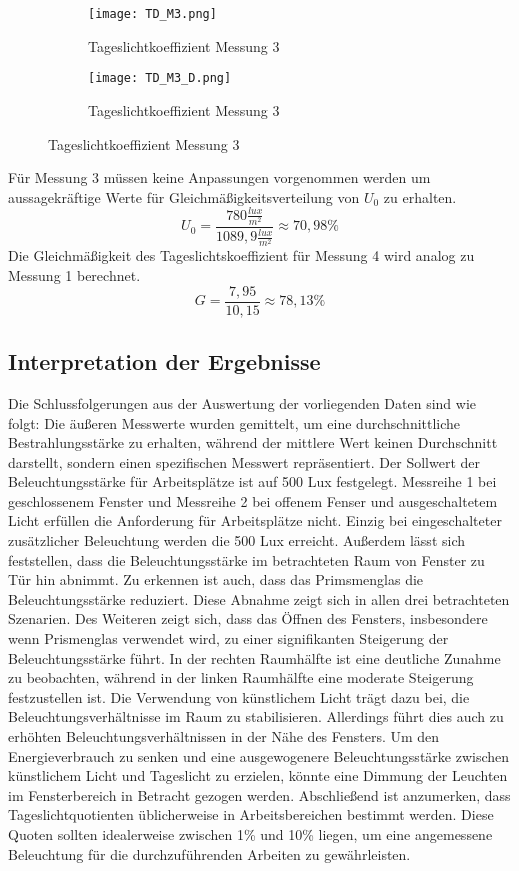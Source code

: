   \begin{figure}[H]
  \centering
  \begin{subfigure}[c]{0.5\textwidth}
      \texttt{[image: TD\_M3.png]}
      \caption{Tageslichtkoeffizient Messung 3}
      \label{fig:Tageslichtkoeffizient Messung 3}
  \end{subfigure}
  \hfill
  \begin{subfigure}[c]{0.45\textwidth}
      \texttt{[image: TD\_M3\_D.png]}
      \caption{Tageslichtkoeffizient Messung 3}
      \label{fig:Tageslichtkoeffizient Messung 3 Draufsicht}
  \end{subfigure}
  \label{fig:Messung 3 Tageslichtkoeffizient}
  \end{figure}
Für Messung 3 müssen keine Anpassungen vorgenommen werden um aussagekräftige Werte für Gleichmäßigkeitsverteilung von $U_0$ zu erhalten.
  $$U_0 = \frac{780\frac{lux}{m^2}}{1089,9\frac{lux}{m^2}}\approx 70,98\%$$
  Die Gleichmäßigkeit des Tageslichtskoeffizient für Messung 4 wird analog zu Messung 1 berechnet.
  $$G = \frac{7,95}{10,15}\approx 78,13\%$$
\newpage
\subsection{Interpretation der Ergebnisse}
Die Schlussfolgerungen aus der Auswertung der vorliegenden Daten sind wie folgt: Die äußeren Messwerte wurden gemittelt, um eine durchschnittliche Bestrahlungsstärke zu erhalten, während der mittlere Wert keinen Durchschnitt darstellt, sondern einen spezifischen Messwert repräsentiert.
Der Sollwert der Beleuchtungsstärke für Arbeitsplätze ist auf 500 Lux festgelegt. Messreihe 1 bei geschlossenem Fenster und Messreihe 2 bei offenem Fenser und ausgeschaltetem Licht erfüllen die Anforderung für Arbeitsplätze nicht. Einzig bei eingeschalteter zusätzlicher Beleuchtung werden die 500 Lux erreicht.
Außerdem lässt sich feststellen, dass die Beleuchtungsstärke im betrachteten Raum von Fenster zu Tür hin abnimmt. Zu erkennen ist auch, dass das Primsmenglas die Beleuchtungsstärke reduziert. Diese Abnahme zeigt sich in allen drei betrachteten Szenarien.
Des Weiteren zeigt sich, dass das Öffnen des Fensters, insbesondere wenn Prismenglas verwendet wird, zu einer signifikanten Steigerung der Beleuchtungsstärke führt. In der rechten Raumhälfte ist eine deutliche Zunahme zu beobachten, während in der linken Raumhälfte eine moderate Steigerung festzustellen ist.
Die Verwendung von künstlichem Licht trägt dazu bei, die Beleuchtungsverhältnisse im Raum zu stabilisieren. Allerdings führt dies auch zu erhöhten Beleuchtungsverhältnissen in der Nähe des Fensters. Um den Energieverbrauch zu senken und eine ausgewogenere Beleuchtungsstärke zwischen künstlichem Licht und Tageslicht zu erzielen, könnte eine Dimmung der Leuchten im Fensterbereich in Betracht gezogen werden.
Abschließend ist anzumerken, dass Tageslichtquotienten üblicherweise in Arbeitsbereichen bestimmt werden. Diese Quoten sollten idealerweise zwischen 1\% und 10\% liegen, um eine angemessene Beleuchtung für die durchzuführenden Arbeiten zu gewährleisten.
